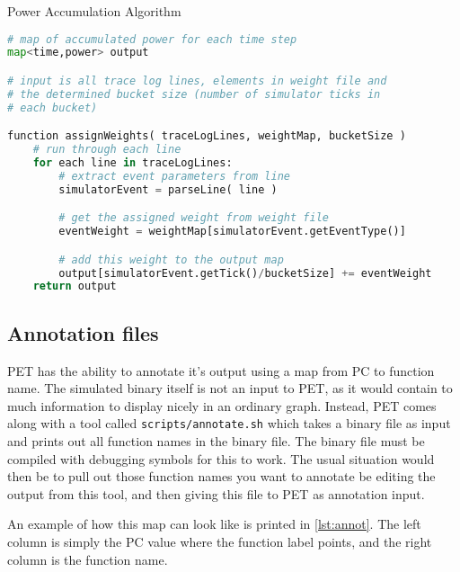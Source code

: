 \begin{algorithm}
\caption{Power Accumulation Algorithm}
\label{alg:power_accum_algo}
\begin{lstlisting}[language=Python]
# map of accumulated power for each time step
map<time,power> output

# input is all trace log lines, elements in weight file and
# the determined bucket size (number of simulator ticks in
# each bucket)

function assignWeights( traceLogLines, weightMap, bucketSize )
    # run through each line
    for each line in traceLogLines:
        # extract event parameters from line
        simulatorEvent = parseLine( line )

        # get the assigned weight from weight file
        eventWeight = weightMap[simulatorEvent.getEventType()]

        # add this weight to the output map
        output[simulatorEvent.getTick()/bucketSize] += eventWeight
    return output
\end{lstlisting}
\end{algorithm}
%

\subsection{Annotation files}
\label{subsec:annot}
PET has the ability to annotate it's output using a map from PC to function name. The
simulated binary itself is not an input to PET, as it would contain to much information to display nicely in
an ordinary graph. Instead, PET comes along with a tool called \texttt{scripts/annotate.sh} which takes
a binary file as input and prints out all function names in the binary file. The binary file must be compiled
with debugging symbols for this to work. The usual situation would then be to pull out those function names you want
to annotate be editing the output from this tool, and then giving this file to PET as annotation input.

An example of how this map can look like is printed in \autoref{lst:annot}. The
left column is simply the PC value where the function label points, and the
right column is the function name.

